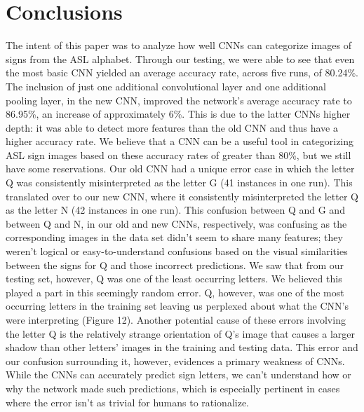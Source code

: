 \documentclass[11pt]{article}
\begin{document}
\section{Conclusions}

The intent of this paper was to analyze how well CNNs can categorize images of signs from the ASL alphabet. Through our testing, we were able to see that even the most basic CNN yielded an average accuracy rate, across five runs, of 80.24\%. The inclusion of just one additional convolutional layer and one additional pooling layer, in the new CNN, improved the network's average accuracy rate to 86.95\%, an increase of approximately 6\%. This is due to the latter CNNs higher depth: it was able to detect more features than the old CNN and thus have a higher accuracy rate. We believe that a CNN can be a useful tool in categorizing ASL sign images based on these accuracy rates of greater than 80\%, but we still have some reservations. Our old CNN
had a unique error case in which the letter Q was consistently misinterpreted as the letter G (41 instances in one run). This translated over to our new CNN, where it consistently misinterpreted the letter Q as the letter N (42 instances in one run). This confusion between Q and G and between Q and N, in our old and new CNNs, respectively, was confusing as the corresponding images in the data set didn't seem to share many features; they weren't logical or easy-to-understand confusions based on the visual similarities between the signs for Q and those incorrect predictions. We saw that from our testing set, however, Q was one of the least occurring letters. We believed this played a part in this seemingly random error. Q, however, was one of the most occurring letters in the training set leaving us perplexed about what the CNN's were interpreting (Figure 12). Another potential cause of these errors involving the letter Q is the relatively strange orientation of Q's image that causes a larger shadow than other letters' images in the training and testing data. This error and our confusion surrounding it, however, evidences a primary weakness of CNNs. While the CNNs can accurately predict sign letters, we can't understand how or why the network made such predictions, which is especially pertinent in cases where the error isn't as trivial for humans to rationalize.
\end{document}
